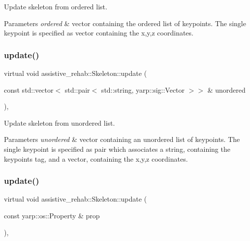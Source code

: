 Update skeleton from ordered list. 


\begin{DoxyParams}{Parameters}
{\em ordered} & vector containing the ordered list of keypoints. The single keypoint is specified as vector containing the x,y,z coordinates. \\
\hline
\end{DoxyParams}
\mbox{\label{classassistive__rehab_1_1Skeleton_ab9642d6621d0a2b189c020f4d7695b14}} 
\subsubsection{\texorpdfstring{update()}{update()}\hspace{0.1cm}{\footnotesize\ttfamily [2/3]}}
{\footnotesize\ttfamily virtual void assistive\+\_\+rehab\+::\+Skeleton\+::update (\begin{DoxyParamCaption}\item[{const std\+::vector$<$ std\+::pair$<$ std\+::string, yarp\+::sig\+::\+Vector $>$$>$ \&}]{unordered }\end{DoxyParamCaption})\hspace{0.3cm}{\ttfamily [virtual]}, {\ttfamily [inherited]}}



Update skeleton from unordered list. 


\begin{DoxyParams}{Parameters}
{\em unordered} & vector containing an unordered list of keypoints. The single keypoint is specified as pair which associates a string, containing the keypoint\textquotesingle{}s tag, and a vector, containing the x,y,z coordinates. \\
\hline
\end{DoxyParams}
\mbox{\label{classassistive__rehab_1_1Skeleton_ae3346b2f363e1812fdc88e59d1f7bf7d}} 
\subsubsection{\texorpdfstring{update()}{update()}\hspace{0.1cm}{\footnotesize\ttfamily [3/3]}}
{\footnotesize\ttfamily virtual void assistive\+\_\+rehab\+::\+Skeleton\+::update (\begin{DoxyParamCaption}\item[{const yarp\+::os\+::\+Property \&}]{prop }\end{DoxyParamCaption})\hspace{0.3cm}{\ttfamily [virtual]}, {\ttfamily [inherited]}}



